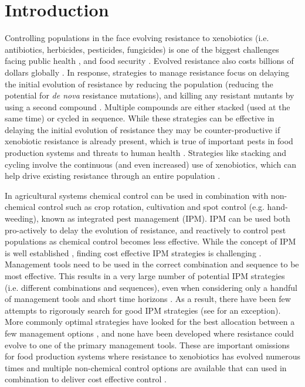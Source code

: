 \documentclass[12pt, a4paper]{article}
\begin{document}
\section*{Introduction}
Controlling populations in the face evolving resistance to xenobiotics (i.e. antibiotics, herbicides, pesticides, fungicides) is one of the biggest challenges facing public health \citep{Laxm2016, Willy2017}, and food security \citep{Denh1992, Palu2001, Hick2018}. Evolved resistance also costs billions of dollars globally \citep{Livi2016, Ches2018, Hick2018}. In response, strategies to manage resistance focus on delaying the initial evolution of resistance by reducing the population (reducing the potential for \textit{de nova} resistance mutations), and killing any resistant mutants by using a second compound \citep{Denh1992, REX2013}. Multiple compounds are either stacked (used at the same time) or cycled in sequence. While these strategies can be effective in delaying the initial evolution of resistance they may be counter-productive if xenobiotic resistance is already present, which is true of important pests in food production systems \citep{Denh1992, Hick2018} and threats to human health \citep{Willy2017}. Strategies like stacking and cycling involve the continuous (and even increased) use of xenobiotics, which can help drive existing resistance through an entire population \citep{Denh1992, Hick2018}.

In agricultural systems chemical control can be used in combination with non-chemical control such as crop rotation, cultivation and spot control (e.g. hand-weeding), known as integrated pest management (IPM). IPM can be used both pro-actively to delay the evolution of resistance, and reactively to control pest populations as chemical control becomes less effective. While the concept of IPM is well established \citep{Bott1979}, finding cost effective IPM strategies is challenging \citep{Dana2014, Chal2015}. Management tools need to be used in the correct combination and sequence to be most effective. This results in a very large number of potential IPM strategies (i.e. different combinations and sequences), even when considering only a handful of management tools and short time horizons \citep{Chal2015}. As a result, there have been few attempts to rigorously search for good IPM strategies (see \citealp{Chal2015} for an exception). More commonly optimal strategies have looked for the best allocation between a few management options \citep{EpanN2010, Meis2016, Okum2016, Buyu2017}, and none have been developed where resistance could evolve to one of the primary management tools. These are important omissions for food production systems where resistance to xenobiotics has evolved numerous times \citep{Denh1992, Palu2001} and multiple non-chemical control options are available that can used in combination to deliver cost effective control \citep{Chal2015}.
\end{document}
